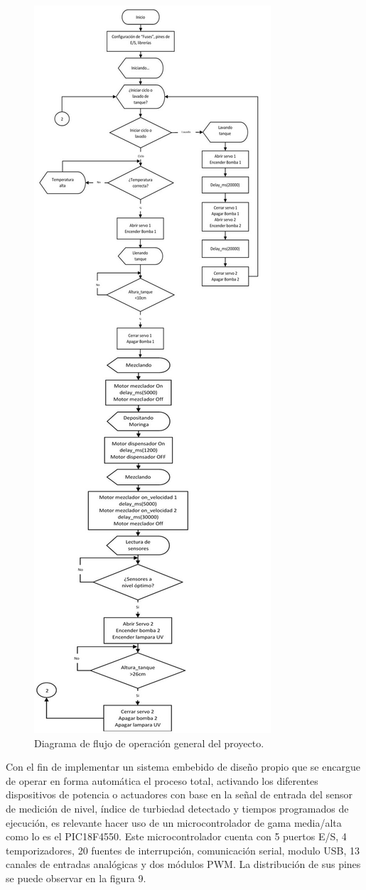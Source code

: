 \documentclass[conference]{IEEEtran}
\begin{document}
	\begin{figure}[!htbp]
		\centering
		\includegraphics[width=0.6\columnwidth]{fig8.jpg}
		\caption{Diagrama de flujo de operación general del proyecto.}
		\label{fig:secuencia-acciones}
	\end{figure}

	Con el fin de implementar un sistema embebido de diseño propio que se encargue de operar en forma automática el proceso total, activando los diferentes dispositivos de potencia o actuadores con base en la señal de entrada del sensor de medición de nivel, índice de turbiedad detectado y tiempos programados de ejecución, es relevante hacer uso de un microcontrolador de gama media/alta como lo es el PIC18F4550. Este microcontrolador cuenta con 5 puertos E/S, 4 temporizadores, 20 fuentes de interrupción, comunicación serial, modulo USB, 13 canales de entradas analógicas y dos módulos PWM. La distribución de sus pines se puede observar en la figura 9.
	
\end{document}
